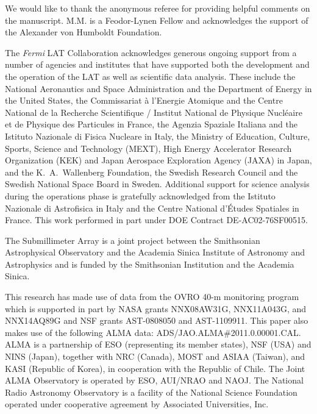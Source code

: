 \documentclass[twocolumn]{aastex62}
\begin{document}
\begin{acknowledgments}
We would like to thank the anonymous referee for providing helpful comments on the manuscript.
M.M.  is  a  Feodor-Lynen Fellow and acknowledges the support of the Alexander von Humboldt  Foundation.

The \textit{Fermi} LAT Collaboration acknowledges generous ongoing support
from a number of agencies and institutes that have supported both the
development and the operation of the LAT as well as scientific data analysis.
These include the National Aeronautics and Space Administration and the
Department of Energy in the United States, the Commissariat \`a l'Energie Atomique
and the Centre National de la Recherche Scientifique / Institut National de Physique
Nucl\'eaire et de Physique des Particules in France, the Agenzia Spaziale Italiana
and the Istituto Nazionale di Fisica Nucleare in Italy, the Ministry of Education,
Culture, Sports, Science and Technology (MEXT), High Energy Accelerator Research
Organization (KEK) and Japan Aerospace Exploration Agency (JAXA) in Japan, and
the K.~A.~Wallenberg Foundation, the Swedish Research Council and the
Swedish National Space Board in Sweden.
Additional support for science analysis during the operations phase is gratefully
acknowledged from the Istituto Nazionale di Astrofisica in Italy and the Centre
National d'\'Etudes Spatiales in France. This work performed in part under DOE
Contract DE-AC02-76SF00515.

The Submillimeter Array is a joint project between the Smithsonian Astrophysical Observatory and the Academia Sinica Institute of Astronomy and Astrophysics and is funded by the Smithsonian Institution and the Academia Sinica.

This research has made use of data from the OVRO 40-m monitoring program~\citep{2011ApJS..194...29R} which is supported in part by NASA grants NNX08AW31G, NNX11A043G, and NNX14AQ89G and NSF grants AST-0808050 and AST-1109911.
This paper also makes use of the following ALMA data: ADS/JAO.ALMA\#2011.0.00001.CAL. ALMA is a partnership of ESO (representing its member states), NSF (USA) and NINS (Japan), together with NRC (Canada), MOST and ASIAA (Taiwan), and KASI (Republic of Korea), in cooperation with the Republic of Chile. The Joint ALMA Observatory is operated by ESO, AUI/NRAO and NAOJ. The National Radio Astronomy Observatory is a facility of the National Science Foundation operated under cooperative agreement by Associated Universities, Inc.
\end{acknowledgments}
\end{document}

